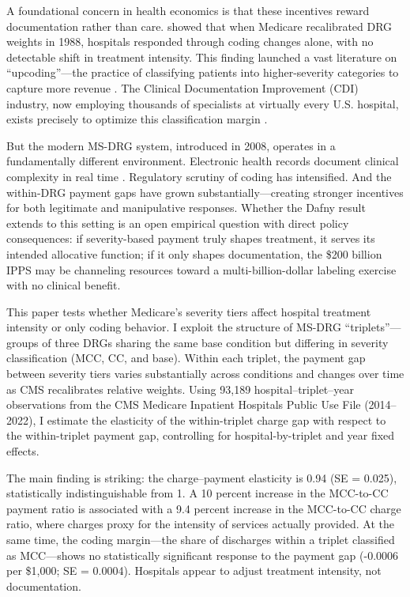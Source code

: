 \documentclass[12pt]{article}
\begin{document}
A foundational concern in health economics is that these incentives reward documentation rather than care. \citet{dafny2005} showed that when Medicare recalibrated DRG weights in 1988, hospitals responded through coding changes alone, with no detectable shift in treatment intensity. This finding launched a vast literature on ``upcoding''---the practice of classifying patients into higher-severity categories to capture more revenue \citep{silverman2004, carter1990, sacarny2018, geruso2020}. The Clinical Documentation Improvement (CDI) industry, now employing thousands of specialists at virtually every U.S. hospital, exists precisely to optimize this classification margin \citep{harrington2017}.

But the modern MS-DRG system, introduced in 2008, operates in a fundamentally different environment. Electronic health records document clinical complexity in real time \citep{jha2005}. Regulatory scrutiny of coding has intensified. And the within-DRG payment gaps have grown substantially---creating stronger incentives for both legitimate and manipulative responses. Whether the Dafny result extends to this setting is an open empirical question with direct policy consequences: if severity-based payment truly shapes treatment, it serves its intended allocative function; if it only shapes documentation, the \$200 billion IPPS may be channeling resources toward a multi-billion-dollar labeling exercise with no clinical benefit.

This paper tests whether Medicare's severity tiers affect hospital treatment intensity or only coding behavior. I exploit the structure of MS-DRG ``triplets''---groups of three DRGs sharing the same base condition but differing in severity classification (MCC, CC, and base). Within each triplet, the payment gap between severity tiers varies substantially across conditions and changes over time as CMS recalibrates relative weights. Using 93,189 hospital--triplet--year observations from the CMS Medicare Inpatient Hospitals Public Use File (2014--2022), I estimate the elasticity of the within-triplet charge gap with respect to the within-triplet payment gap, controlling for hospital-by-triplet and year fixed effects.

The main finding is striking: the charge--payment elasticity is 0.94 (SE = 0.025), statistically indistinguishable from 1. A 10 percent increase in the MCC-to-CC payment ratio is associated with a 9.4 percent increase in the MCC-to-CC charge ratio, where charges proxy for the intensity of services actually provided. At the same time, the coding margin---the share of discharges within a triplet classified as MCC---shows no statistically significant response to the payment gap (-0.0006 per \$1,000; SE = 0.0004). Hospitals appear to adjust treatment intensity, not documentation.
\end{document}
